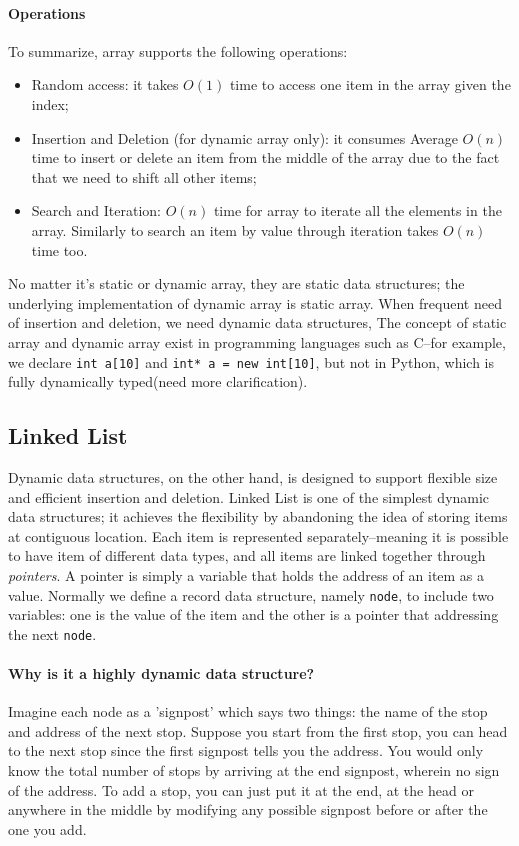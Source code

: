 \documentclass[../main.tex]{subfiles}
\begin{document}
\paragraph{Operations} To summarize, array supports the following operations:
\begin{itemize}
    \item Random access: it takes $O(1)$ time to access one item in the array given the index;
    \item Insertion and Deletion (for dynamic array only): it consumes Average $O(n)$ time to insert or delete an item from the middle of the array due to the fact that we need to shift all other items;
    \item Search and Iteration: $O(n)$ time for array to iterate all the elements in the array. Similarly to search an item by value through iteration takes $O(n)$ time too.
\end{itemize}
No matter it's static or dynamic array, they are static data structures; the underlying implementation of dynamic array is static array. When frequent need of insertion and deletion, we need dynamic data structures,  The concept of static array and dynamic array exist in programming languages such as  C--for example, we declare \texttt{int a[10]} and \texttt{int* a = new int[10]}, but not in Python, which is fully dynamically typed(need more clarification).  

\subsection{Linked List}
Dynamic data structures, on the other hand, is designed to support flexible size and efficient insertion and deletion. Linked List is one of the simplest dynamic data structures; it achieves the flexibility by abandoning the idea of storing items at contiguous location. Each item is represented separately--meaning it is possible to have item of different data types, and all items are linked together through \textit{pointers}. A pointer is simply a variable that holds the address of an item as a value. Normally we define a record data structure, namely \texttt{node}, to include two variables: one is the value of the item and the other is a pointer that addressing the next \texttt{node}. 

\paragraph{Why is it a highly dynamic data structure?} Imagine each node as a 'signpost' which says two things: the name of the stop and address of the next stop. Suppose you start from the first stop, you can head to the next stop since the first signpost tells you the address. You would only know the total number of stops by arriving at the end signpost, wherein no sign of the address. To add a stop, you can just put it at the end, at the head or anywhere in the middle by modifying any possible signpost before or after the one you add. 
\end{document}
